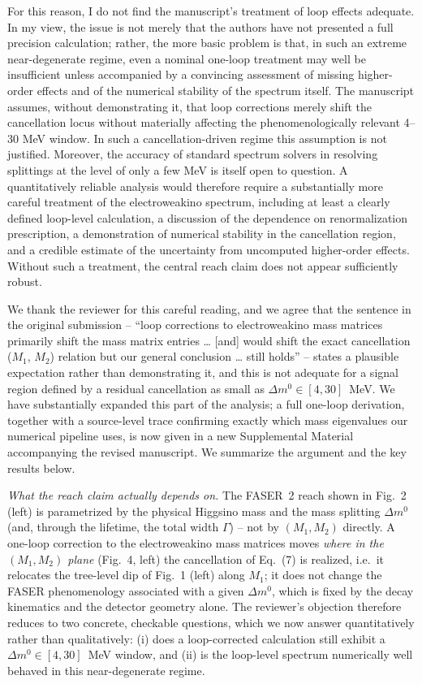 \documentclass{ar2rc}
\begin{document}
\RCpar For this reason, I do not find the manuscript’s treatment of loop effects adequate. In my view, the issue is not merely that the authors have not presented a full precision calculation; rather, the more basic problem is that, in such an extreme near-degenerate regime, even a nominal one-loop treatment may well be insufficient unless accompanied by a convincing assessment of missing higher-order effects and of the numerical stability of the spectrum itself. The manuscript assumes, without demonstrating it, that loop corrections merely shift the cancellation locus without materially affecting the phenomenologically relevant 4–30 MeV window. In such a cancellation-driven regime this assumption is not justified. Moreover, the accuracy of standard spectrum solvers in resolving splittings at the level of only a few MeV is itself open to question. A quantitatively reliable analysis would therefore require a substantially more careful treatment of the electroweakino spectrum, including at least a clearly defined loop-level calculation, a discussion of the dependence on renormalization prescription, a demonstration of numerical stability in the cancellation region, and a credible estimate of the uncertainty from uncomputed higher-order effects. Without such a treatment, the central reach claim does not appear sufficiently robust.

\AR We thank the reviewer for this careful reading, and we agree that the sentence in the original submission -- ``loop corrections to electroweakino mass matrices primarily shift the mass matrix entries \ldots{} [and] would shift the exact cancellation ($M_1$, $M_2$) relation but our general conclusion \ldots{} still holds'' -- states a plausible expectation rather than demonstrating it, and this is not adequate for a signal region defined by a residual cancellation as small as $\Delta m^0\in[4,30]$~MeV. We have substantially expanded this part of the analysis; a full one-loop derivation, together with a source-level trace confirming exactly which mass eigenvalues our numerical pipeline uses, is now given in a new Supplemental Material accompanying the revised manuscript. We summarize the argument and the key results below.

\textit{What the reach claim actually depends on.} The FASER~2 reach shown in Fig.~2 (left) is parametrized by the physical Higgsino mass and the mass splitting $\Delta m^0$ (and, through the lifetime, the total width $\Gamma$) -- not by $(M_1,M_2)$ directly. A one-loop correction to the electroweakino mass matrices moves \emph{where in the $(M_1,M_2)$ plane} (Fig.~4, left) the cancellation of Eq.~(7) is realized, i.e.\ it relocates the tree-level dip of Fig.~1 (left) along $M_1$; it does not change the FASER phenomenology associated with a given $\Delta m^0$, which is fixed by the decay kinematics and the detector geometry alone. The reviewer's objection therefore reduces to two concrete, checkable questions, which we now answer quantitatively rather than qualitatively: (i) does a loop-corrected calculation still exhibit a $\Delta m^0\in[4,30]$~MeV window, and (ii) is the loop-level spectrum numerically well behaved in this near-degenerate regime.
\end{document}
